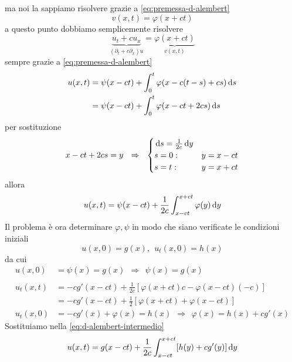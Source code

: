 ma noi la sappiamo risolvere grazie a \eqref{eq:premessa-d-alembert}
\begin{equation*}
    v(x,t) =\varphi (x+ct)
\end{equation*}
a questo punto dobbiamo semplicemente risolvere
\begin{equation*}
    \underbrace{u_{t} +cu_{x}}_{(\partial _{t} +c\partial _{x}) u} =\underbrace{\varphi (x+ct)}_{v(x,t)}
\end{equation*}
sempre grazie a \eqref{eq:premessa-d-alembert}
\begin{align*}
    u(x,t) & =\psi (x-ct) +\int ^{t}_{0} \varphi (x-c(t-s) +cs) \,\mathrm d s \\
           & =\psi (x-ct) +\int ^{t}_{0} \varphi (x-ct+2cs) \,\mathrm d s
\end{align*}
per sostituzione
\begin{equation*}
    x-ct+2cs=y\ \ \Rightarrow \ \ \begin{cases}
        \,\mathrm d s=\frac{1}{2c} \,\mathrm d y &        \\
        s=0:                 & y=x-ct \\
        s=t:                 & y=x+ct
    \end{cases}
\end{equation*}
allora
\begin{equation}
    u(x,t) =\psi (x-ct) +\frac{1}{2c}\int ^{x+ct}_{x-ct} \varphi (y) \,\mathrm d y
    \label{eq:d-alembert-intermedio}
\end{equation}
Il problema è ora determinare $\varphi ,\psi $ in modo che siano verificate le condizioni iniziali
\begin{equation*}
    u(x,0) =g(x) ,\ \ u_{t}(x,0) =h(x)
\end{equation*}
da cui
\begin{align*}
    u(x,0)     & =\psi (x) =g(x) \ \ \Rightarrow \ \ \boxed{\psi (x) =g(x)}                        \\
               &                                                                                   \\
    u_{t}(x,t) & =-cg'(x-ct) +\frac{1}{2c}[ \varphi (x+ct) c-\varphi (x-ct)(-c)]                   \\
               & =-cg'(x-ct) +\frac{1}{2}[ \varphi (x+ct) +\varphi (x-ct)]                         \\
    u_{t}(x,0) & =-cg'(x) +\varphi (x) =h(x) \ \ \Rightarrow \ \ \boxed{\varphi (x) =h(x) +cg'(x)}
\end{align*}
Sostituiamo nella \eqref{eq:d-alembert-intermedio}
\begin{equation*}
    u(x,t) =g(x-ct) +\frac{1}{2c}\int ^{x+ct}_{x-ct}[ h(y) +cg'(y)] \,\mathrm d y
\end{equation*}
